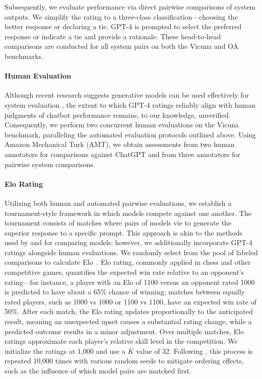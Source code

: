 Subsequently, we evaluate performance via direct pairwise comparisons of system outputs. We simplify the rating to a three-class classification—choosing the better response or declaring a tie. GPT-4 is prompted to select the preferred response or indicate a tie and provide a rationale. These head-to-head comparisons are conducted for all system pairs on both the Vicuna and OA benchmarks.

\paragraph{Human Evaluation} Although recent research suggests generative models can be used effectively for system evaluation \citep{fu2023gptscore}, the extent to which GPT-4 ratings reliably align with human judgments of chatbot performance remains, to our knowledge, unverified. Consequently, we perform two concurrent human evaluations on the Vicuna benchmark, paralleling the automated evaluation protocols outlined above. Using Amazon Mechanical Turk (AMT), we obtain assessments from two human annotators for comparisons against ChatGPT and from three annotators for pairwise system comparisons.

\paragraph{Elo Rating} Utilizing both human and automated pairwise evaluations, we establish a tournament-style framework in which models compete against one another. The tournament consists of matches where pairs of models vie to generate the superior response to a specific prompt. This approach is akin to the methods used by \citet{bai2022training} and \citet{vicuna2023} for comparing models; however, we additionally incorporate GPT-4 ratings alongside human evaluations. We randomly select from the pool of labeled comparisons to calculate Elo~\citep{elo1967proposed,elo1978rating}. Elo rating, commonly applied in chess and other competitive games, quantifies the expected win rate relative to an opponent’s rating—for instance, a player with an Elo of 1100 versus an opponent rated 1000 is predicted to have about a 65\% chance of winning; matches between equally rated players, such as 1000 vs 1000 or 1100 vs 1100, have an expected win rate of 50\%. After each match, the Elo rating updates proportionally to the anticipated result, meaning an unexpected upset causes a substantial rating change, while a predicted outcome results in a minor adjustment. Over multiple matches, Elo ratings approximate each player’s relative skill level in the competition. We initialize the ratings at 1,000 and use a $K$ value of 32. Following \citet{vicuna2023}, this process is repeated 10,000 times with various random seeds to mitigate ordering effects, such as the influence of which model pairs are matched first.

